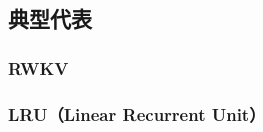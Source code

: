 \subsection{典型代表}

\subsubsection{RWKV\cite{peng2023rwkv}}

\subsubsection{LRU（Linear Recurrent Unit）\cite{orvieto2023resurrecting}}